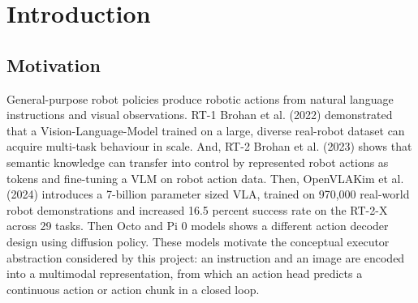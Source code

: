 \documentclass{article}
\begin{document}
\begin{abstract}
PrefMem is evaluated using development, non-confirmatory experiments in a restricted tabletop domain. With one applicable scoped preference, autonomous correct goal resolution increased from 0/36 observations under empty Memory to 36/36 under populated Memory, while both conditions achieved 36/36 final goal correctness after permitted clarification. Conflicting preferences caused clarification before commitment in 36/36 observations, and a held-out override replication selected the conflicting historical destination in 0/36 observations. A 30-interaction lifecycle experiment nevertheless retained the focal preference at the delayed final probe in only 2/8 stores, exposing a free-text identity limitation. Production Monitor improved the registered host route from 12/36 to 22/36 paired observations, while production Validator prevented false completion in all 21 visibly incomplete states compared with 0/21 for a stop-after-actions control. In 12 MuJoCo simulation episodes, correct contracts and simulator-truth physical goals occurred in 12/12, all-strict grounding in 11/12, Validator completion in 9/12, and exact one-action strict chain in 8/12.

These results support the PrefMem design as an inspectable systems architecture with measurable boundary-specific effects and identifiable failure mechanisms.

\end{abstract}
\section{Introduction}
\subsection{Motivation}
General-purpose robot policies produce robotic actions from natural language instructions and visual observations. RT-1 Brohan et al. (2022) demonstrated that a Vision-Language-Model trained on a large, diverse real-robot dataset can acquire multi-task behaviour in scale. And, RT-2 Brohan et al. (2023) shows that semantic knowledge can transfer into control by represented robot actions as tokens and fine-tuning a VLM on robot action data. Then, OpenVLAKim et al. (2024) introduces a 7-billion parameter sized VLA, trained on 970,000 real-world robot demonstrations and increased 16.5 percent success rate on the RT-2-X across 29 tasks. Then Octo and Pi 0 models shows a different action decoder design using diffusion policy. These models motivate the conceptual executor abstraction considered by this project: an instruction and an image are encoded into a multimodal representation, from which an action head predicts a continuous action or action chunk in a closed loop.
\end{document}
